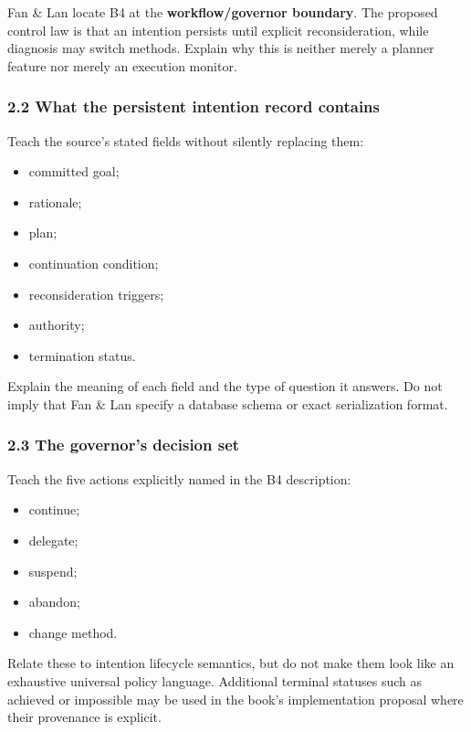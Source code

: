 Fan \& Lan locate B4 at the \textbf{workflow/governor boundary}. The proposed control law is that an intention persists until explicit reconsideration, while diagnosis may switch methods. Explain why this is neither merely a planner feature nor merely an execution monitor.

\subsubsection{2.2 What the persistent intention record contains}\label{what-the-persistent-intention-record-contains}

Teach the source's stated fields without silently replacing them:

\begin{itemize}
\tightlist
\item
  committed goal;
\item
  rationale;
\item
  plan;
\item
  continuation condition;
\item
  reconsideration triggers;
\item
  authority;
\item
  termination status.
\end{itemize}

Explain the meaning of each field and the type of question it answers. Do not imply that Fan \& Lan specify a database schema or exact serialization format.

\subsubsection{2.3 The governor's decision set}\label{the-governors-decision-set}

Teach the five actions explicitly named in the B4 description:

\begin{itemize}
\tightlist
\item
  continue;
\item
  delegate;
\item
  suspend;
\item
  abandon;
\item
  change method.
\end{itemize}

Relate these to intention lifecycle semantics, but do not make them look like an exhaustive universal policy language. Additional terminal statuses such as achieved or impossible may be used in the book's implementation proposal where their provenance is explicit.

